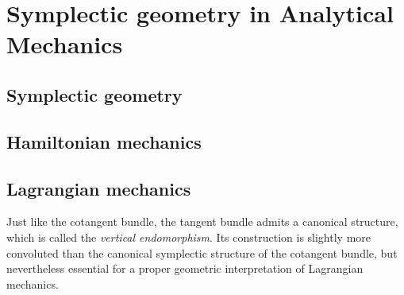 \chapter{Symplectic geometry in Analytical Mechanics}
\label{app:symplectic_geometry}

\section{Symplectic geometry}

\section{Hamiltonian mechanics}

\section{Lagrangian mechanics}
Just like the cotangent bundle, the tangent bundle admits a canonical structure, which is called the \emph{vertical endomorphism}. Its construction is slightly more convoluted than the canonical symplectic structure of the cotangent bundle, but nevertheless essential for a proper geometric interpretation of Lagrangian mechanics. 

